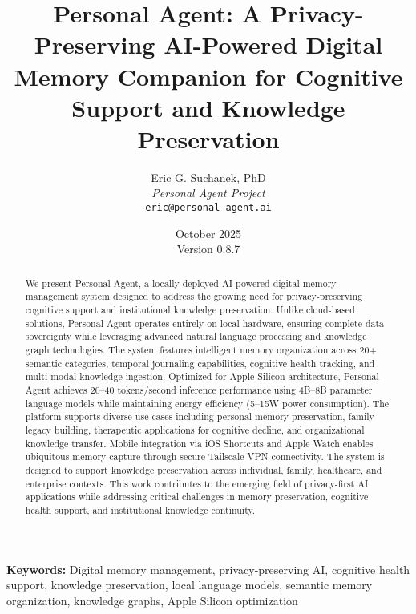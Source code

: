 \documentclass[11pt,letterpaper]{article}
\begin{document}
\title{\textbf{\color{primaryblue}Personal Agent: A Privacy-Preserving AI-Powered Digital Memory Companion for Cognitive Support and Knowledge Preservation}}

\author{
Eric G. Suchanek, PhD\\
\textit{Personal Agent Project}\\
\texttt{eric@personal-agent.ai}
}

\date{October 2025 \\ Version 0.8.7}

\maketitle

\begin{abstract}
\noindent We present Personal Agent, a locally-deployed AI-powered digital memory management system designed to address the growing need for privacy-preserving cognitive support and institutional knowledge preservation. Unlike cloud-based solutions, Personal Agent operates entirely on local hardware, ensuring complete data sovereignty while leveraging advanced natural language processing and knowledge graph technologies. The system features intelligent memory organization across 20+ semantic categories, temporal journaling capabilities, cognitive health tracking, and multi-modal knowledge ingestion. Optimized for Apple Silicon architecture, Personal Agent achieves 20--40 tokens/second inference performance using 4B--8B parameter language models while maintaining energy efficiency (5--15W power consumption). The platform supports diverse use cases including personal memory preservation, family legacy building, therapeutic applications for cognitive decline, and organizational knowledge transfer. Mobile integration via iOS Shortcuts and Apple Watch enables ubiquitous memory capture through secure Tailscale VPN connectivity. The system is designed to support knowledge preservation across individual, family, healthcare, and enterprise contexts. This work contributes to the emerging field of privacy-first AI applications while addressing critical challenges in memory preservation, cognitive health support, and institutional knowledge continuity.
\end{abstract}

\vspace{0.5cm}
\noindent\textbf{Keywords:} Digital memory management, privacy-preserving AI, cognitive health support, knowledge preservation, local language models, semantic memory organization, knowledge graphs, Apple Silicon optimization
\end{document}
